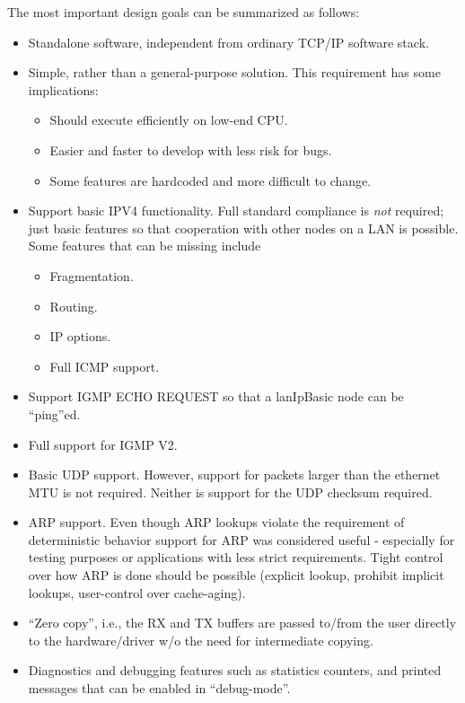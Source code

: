 \documentclass{article}
\newcommand{\lip}{lanIpBasic}
\newcommand{\ethn}{ethernet}
\begin{document}
The most important design goals can be summarized as
follows:
\begin{itemize}
\item Standalone software, independent from ordinary TCP/IP software stack.
\item Simple, rather than a general-purpose solution. This requirement
      has some implications:
      \begin{itemize}
      \item Should execute efficiently on low-end CPU.
      \item Easier and faster to develop with less risk for bugs.
      \item Some features are hardcoded and more difficult to change.
      \end{itemize}
\item Support basic IPV4 functionality. Full standard compliance is
      {\em not} required; just basic features so that cooperation
      with other nodes on a LAN is possible. Some features that
      can be missing include
      \begin{itemize}
      \item Fragmentation.
      \item Routing.
      \item IP options.
      \item Full ICMP support.
      \end{itemize}
\item Support IGMP ECHO REQUEST so that a \lip{} node can be ``ping''ed.
\item Full support for IGMP V2.
\item Basic UDP support. However, support for packets larger than the
      \ethn{} MTU is not required. Neither is support for the UDP checksum
      required.
\item ARP support. Even though ARP lookups violate the requirement of
      deterministic behavior support for ARP was considered useful - especially
      for testing purposes or applications with less strict requirements.
      Tight control over how ARP is done should be possible (explicit lookup,
      prohibit implicit lookups, user-control over cache-aging).
\item ``Zero copy'', i.e., the RX and TX buffers are passed to/from the
      user directly to the hardware/driver w/o the need for intermediate
      copying.
\item Diagnostics and debugging features such as statistics counters, and
      printed messages that can be enabled in ``debug-mode''.
\end{itemize}
\end{document}
